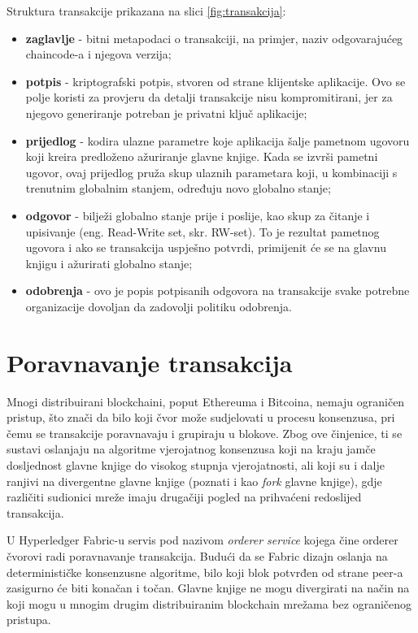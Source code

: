 \documentclass[times, utf8, diplomski]{fer}
\begin{document}
Struktura transakcije prikazana na slici \ref{fig:transakcija}:
\begin{itemize}
\item \textbf{zaglavlje} - bitni metapodaci o transakciji, na primjer, naziv odgovarajućeg chaincode-a i njegova verzija;
\item \textbf{potpis} - kriptografski potpis,  stvoren od strane klijentske aplikacije. Ovo se polje koristi za provjeru da detalji transakcije nisu kompromitirani, jer za njegovo generiranje potreban je privatni ključ aplikacije;
\item \textbf{prijedlog} - kodira ulazne parametre koje aplikacija šalje pametnom ugovoru koji kreira predloženo ažuriranje glavne knjige. Kada se izvrši pametni ugovor, ovaj prijedlog pruža skup ulaznih parametara koji, u kombinaciji s trenutnim globalnim stanjem, određuju novo globalno stanje;
\item \textbf{odgovor} - bilježi globalno stanje prije i poslije, kao skup za čitanje i upisivanje (eng. Read-Write set, skr. RW-set). To je rezultat pametnog ugovora i ako se transakcija uspješno potvrdi, primijenit će se na glavnu knjigu i ažurirati globalno stanje;
\item \textbf{odobrenja} - ovo je popis potpisanih odgovora na transakcije svake potrebne organizacije dovoljan da zadovolji politiku odobrenja.
\end{itemize}
\section{Poravnavanje transakcija}
Mnogi distribuirani blockchaini, poput Ethereuma i Bitcoina, nemaju ograničen pristup, što znači da bilo koji čvor može sudjelovati u procesu konsenzusa, pri čemu se transakcije poravnavaju i grupiraju u blokove. Zbog ove činjenice, ti se sustavi oslanjaju na algoritme vjerojatnog konsenzusa koji na kraju jamče dosljednost glavne knjige do visokog stupnja vjerojatnosti, ali koji su i dalje ranjivi na divergentne glavne knjige (poznati i kao \textit{fork} glavne knjige), gdje različiti sudionici mreže imaju drugačiji pogled na prihvaćeni redoslijed transakcija. \cite{Fabric}

U Hyperledger Fabric-u servis pod nazivom \textit{orderer service} kojega čine orderer čvorovi radi poravnavanje transakcija.  Budući da se Fabric dizajn oslanja na determinističke konsenzusne algoritme, bilo koji blok potvrđen od strane peer-a zasigurno će biti konačan i točan.  Glavne knjige ne mogu divergirati na način na koji mogu u mnogim drugim distribuiranim blockchain mrežama bez ograničenog pristupa.
\end{document}
